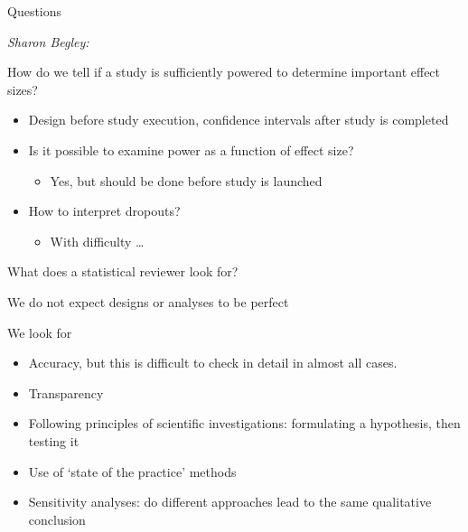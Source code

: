 \documentclass[ignorenonframetext,]{beamer}
\begin{document}
\begin{frame}{Questions}

\textit{Sharon Begley:}

How do we tell if a study is sufficiently powered to determine important
effect sizes?

\begin{itemize}
\item
  \normalsize{Design before study execution, confidence intervals after study is completed}
\item
  Is it possible to examine power as a function of effect size?

  \begin{itemize}
  \itemsep1pt\parskip0pt
  \item
    \normalsize{Yes, but should be done before study is launched}
  \end{itemize}
\item
  How to interpret dropouts?

  \begin{itemize}
  \itemsep1pt\parskip0pt
  \item
    \normalsize{With difficulty \ldots}
  \end{itemize}
\end{itemize}

\end{frame}

\begin{frame}{What does a statistical reviewer look for?}

We do not expect designs or analyses to be perfect \medskip

We look for

\begin{itemize}
\item
  Accuracy, but this is difficult to check in detail in almost all
  cases.
\item
  Transparency
\item
  Following principles of scientific investigations: formulating a
  hypothesis, then testing it
\item
  Use of `state of the practice' methods
\item
  Sensitivity analyses: do different approaches lead to the same
  qualitative conclusion
\end{itemize}

\end{frame}
\end{document}

